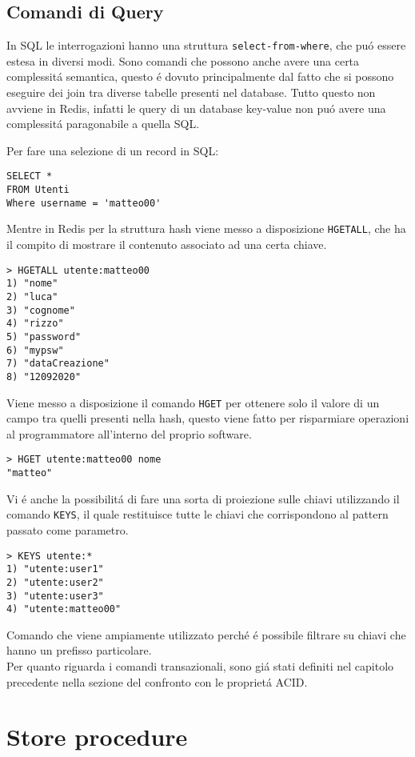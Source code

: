 \subsection{Comandi di Query}
In SQL le interrogazioni hanno una struttura \texttt{select-from-where}, che puó essere estesa in diversi modi. Sono comandi
che possono anche avere una certa complessitá semantica, questo é dovuto principalmente dal fatto che si possono eseguire dei join
tra diverse tabelle presenti nel database.
Tutto questo non avviene in Redis, infatti le query di un database key-value non puó avere una complessitá paragonabile a quella SQL.

Per fare una selezione di un record in SQL:
\begin{lstlisting}[autogobble]
SELECT *
FROM Utenti
Where username = 'matteo00'\end{lstlisting}

Mentre in Redis per la struttura hash viene messo a disposizione \texttt{HGETALL}, che ha il compito di mostrare il contenuto associato ad una certa chiave.
\begin{lstlisting}[autogobble]
> HGETALL utente:matteo00
1) "nome"
2) "luca"
3) "cognome"
4) "rizzo"
5) "password"
6) "mypsw"
7) "dataCreazione"
8) "12092020"
\end{lstlisting}

Viene messo a disposizione il comando \texttt{HGET} per ottenere solo il valore di un campo tra quelli presenti nella hash, questo viene fatto per risparmiare operazioni al programmatore all'interno del proprio software.
\begin{lstlisting}[autogobble]
> HGET utente:matteo00 nome
"matteo"
\end{lstlisting}

Vi é anche la possibilitá di fare una sorta di proiezione sulle chiavi utilizzando il comando \texttt{KEYS}, il quale restituisce tutte le chiavi che corrispondono al pattern passato come parametro.
\begin{lstlisting}[autogobble]
> KEYS utente:*
1) "utente:user1"
2) "utente:user2"
3) "utente:user3"
4) "utente:matteo00"
\end{lstlisting}
Comando che viene ampiamente utilizzato perché é possibile filtrare su chiavi che hanno un prefisso particolare.\\

Per quanto riguarda i comandi transazionali, sono giá stati definiti nel capitolo precedente nella sezione del confronto con le proprietá ACID.

\section{Store procedure}



